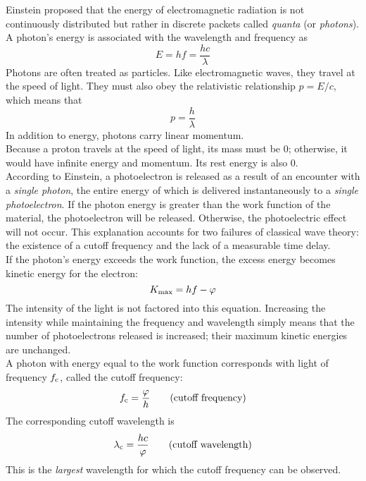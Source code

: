 \documentclass{subfiles}
\begin{document}
			Einstein proposed that the energy of electromagnetic radiation is not continuously distributed but rather in discrete packets called \textit{quanta} (or \textit{photons}). A photon's energy is associated with the wavelength and frequency as
				\[
					E = hf
						= \frac{hc}{\lambda}
						\tag{energy of a photon}
				\]
				Photons are often treated as particles. Like electromagnetic waves, they travel at the speed of light. They must also obey the relativistic relationship \(p = E/c\), which means that
				\[p = \frac{h}{\lambda}\]
				In addition to energy, photons carry linear momentum. \\
				Because a proton travels at the speed of light, its mass must be 0; otherwise, it would have infinite energy and momentum. Its rest energy is also 0. \\
			According to Einstein, a photoelectron is released as a result of an encounter with a \textit{single photon}, the entire energy of which is delivered instantaneously to a \textit{single photoelectron}. If the photon energy is greater than the work function of the material, the photoelectron will be released. Otherwise, the photoelectric effect will not occur. This explanation accounts for two failures of classical wave theory: the existence of a cutoff frequency and the lack of a measurable time delay. \\
			If the photon's energy exceeds the work function, the excess energy becomes kinetic energy for the electron:
				\[K_{\text{max}} = hf - \varphi\]
				The intensity of the light is not factored into this equation. Increasing the intensity while maintaining the frequency and wavelength simply means that the number of photoelectrons released is increased; their maximum kinetic energies are unchanged. \\
			A photon with energy equal to the work function corresponds with light of frequency \(f_{\text{c}}\), called the cutoff frequency:
				\[f_{\text{c}} = \frac{\varphi}{h} \tag{cutoff frequency}\]
				The corresponding cutoff wavelength is
				\[\lambda_{\text{c}} = \frac{hc}{\varphi} \tag{cutoff wavelength}\]
				This is the \textit{largest} wavelength for which the cutoff frequency can be observed.
\end{document}
